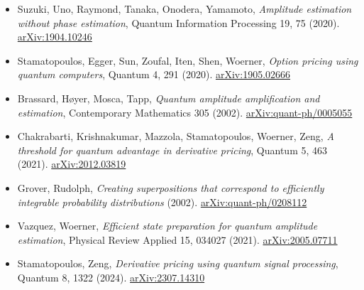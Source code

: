 \documentclass[
  10pt,
]{article}
\providecommand{\tightlist}{%
  \setlength{\itemsep}{0pt}\setlength{\parskip}{0pt}}
\begin{document}
\begin{itemize}
\tightlist
\item
  Suzuki, Uno, Raymond, Tanaka, Onodera, Yamamoto, \emph{Amplitude
  estimation without phase estimation}, Quantum Information Processing
  19, 75 (2020).
  \href{https://arxiv.org/abs/1904.10246}{arXiv:1904.10246}
\item
  Stamatopoulos, Egger, Sun, Zoufal, Iten, Shen, Woerner, \emph{Option
  pricing using quantum computers}, Quantum 4, 291 (2020).
  \href{https://arxiv.org/abs/1905.02666}{arXiv:1905.02666}
\item
  Brassard, Høyer, Mosca, Tapp, \emph{Quantum amplitude amplification
  and estimation}, Contemporary Mathematics 305 (2002).
  \href{https://arxiv.org/abs/quant-ph/0005055}{arXiv:quant-ph/0005055}
\item
  Chakrabarti, Krishnakumar, Mazzola, Stamatopoulos, Woerner, Zeng,
  \emph{A threshold for quantum advantage in derivative pricing},
  Quantum 5, 463 (2021).
  \href{https://arxiv.org/abs/2012.03819}{arXiv:2012.03819}
\item
  Grover, Rudolph, \emph{Creating superpositions that correspond to
  efficiently integrable probability distributions} (2002).
  \href{https://arxiv.org/abs/quant-ph/0208112}{arXiv:quant-ph/0208112}
\item
  Vazquez, Woerner, \emph{Efficient state preparation for quantum
  amplitude estimation}, Physical Review Applied 15, 034027 (2021).
  \href{https://arxiv.org/abs/2005.07711}{arXiv:2005.07711}
\item
  Stamatopoulos, Zeng, \emph{Derivative pricing using quantum signal
  processing}, Quantum 8, 1322 (2024).
  \href{https://arxiv.org/abs/2307.14310}{arXiv:2307.14310}
\end{itemize}
\end{document}
